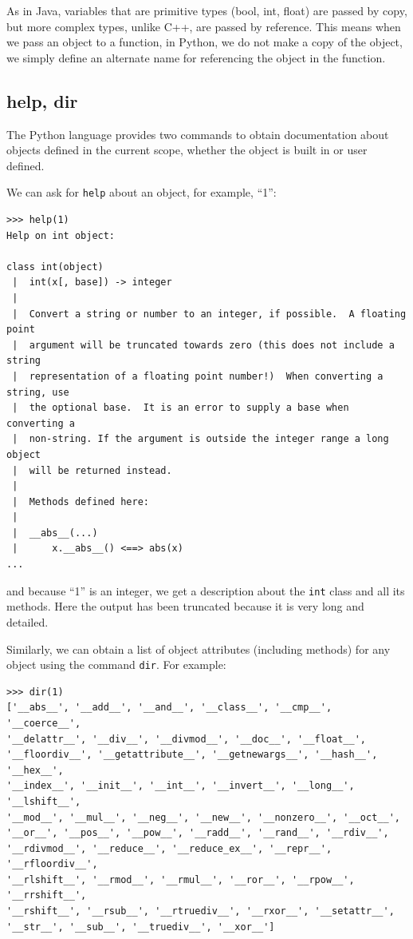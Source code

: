\documentclass[justified,sixbynine]{tufte-book}
\def\ft{\small\tt}
\theoremstyle{plain}%
\theoremstyle{definition}
\theoremstyle{remark}
\begin{document}
\begin{fullwidth}
As in Java, variables that are primitive types (bool, int, float) are passed by copy, but more complex types, unlike C++, are passed by reference. This means when we pass an object to a function, in Python, we do not make a copy of the object, we simply define an alternate name for referencing the object in the function.

\goodbreak\subsection{help, dir}

 

The Python language provides two commands to obtain documentation about objects defined in the current scope, whether the object is built in or user defined.

We can ask for {\ft help} about an object, for example, ``1'':
\begin{lstlisting}
>>> help(1)
Help on int object:

class int(object)
 |  int(x[, base]) -> integer
 |
 |  Convert a string or number to an integer, if possible.  A floating point
 |  argument will be truncated towards zero (this does not include a string
 |  representation of a floating point number!)  When converting a string, use
 |  the optional base.  It is an error to supply a base when converting a
 |  non-string. If the argument is outside the integer range a long object
 |  will be returned instead.
 |
 |  Methods defined here:
 |
 |  __abs__(...)
 |      x.__abs__() <==> abs(x)
...
\end{lstlisting}
\noindent and because ``1'' is an integer, we get a description about the {\ft int} class and all its methods. Here the output has been truncated because it is very long and detailed.

Similarly, we can obtain a list of object attributes (including methods) for any object using the command {\ft dir}. For example:
\begin{lstlisting}
>>> dir(1)
['__abs__', '__add__', '__and__', '__class__', '__cmp__', '__coerce__',
'__delattr__', '__div__', '__divmod__', '__doc__', '__float__',
'__floordiv__', '__getattribute__', '__getnewargs__', '__hash__', '__hex__',
'__index__', '__init__', '__int__', '__invert__', '__long__', '__lshift__',
'__mod__', '__mul__', '__neg__', '__new__', '__nonzero__', '__oct__',
'__or__', '__pos__', '__pow__', '__radd__', '__rand__', '__rdiv__',
'__rdivmod__', '__reduce__', '__reduce_ex__', '__repr__', '__rfloordiv__',
'__rlshift__', '__rmod__', '__rmul__', '__ror__', '__rpow__', '__rrshift__',
'__rshift__', '__rsub__', '__rtruediv__', '__rxor__', '__setattr__',
'__str__', '__sub__', '__truediv__', '__xor__']
\end{lstlisting}


\end{fullwidth}
\end{document}
